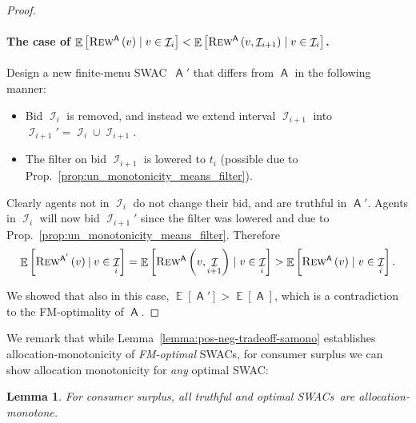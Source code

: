\documentclass[11pt,letterpaper]{article}
\newcommand{\sqbr}[1]{\left[ #1 \right]}
\newcommand{\amono}{allocation-monotone\xspace}
\newcommand{\swac}{SWAC\xspace}
\newcommand{\swacs}{SWACs\xspace}
\newcommand{\finauc}{finite-menu \swac}
\DeclareMathOperator*{\E}{\bb{E}}
\newcommand{\given}{\medspace | \medspace}
\newcommand{\bb}[1]{\mathbb{#1}}
\DeclareMathOperator{\A}{\auc{A}}
\DeclareMathOperator{\I}{\mathcal{I}}
\newcommand{\g}{g}
\theoremstyle{plain}
\newtheorem{lemma}[theorem]{Lemma}
\newcommand{\auc}[1]{\mathsf{#1}}
\begin{document}
\begin{proof}
\paragraph{The case of $\E\sqbr{\trew[\A]{v}\mid v\in\I_i}<\E\sqbr{\rew[\A]{v}{\I_{i+1}}\mid v\in\I_i}$.}
Design a new \finauc\ $\A'$ that differs from $\A$ in the following manner:
        \begin{itemize}
            \item Bid $\I_i$ is removed, and instead we extend interval $\I_{i+1}$ into $\I_{i+1}'=\I_i\cup\I_{i+1}$.
            \item The filter on bid $\I_{i+1}$ is lowered to $t_i$ (possible due to Prop.~\ref{prop:un_monotonicity_means_filter}).
        \end{itemize}
        Clearly agents not in $\I_i$ do not change their bid, and are truthful in $\A'$. Agents in $\I_i$ will now bid $\I_{i+1}'$ since the filter was lowered and due to Prop.~\ref{prop:un_monotonicity_means_filter}. Therefore 
        \begin{align*}
            \E\sqbr{\trew[\A']{v}\given v\in\I_i}=\E\sqbr{\rew[\A]{v}{\I_{i+1}}\mid v\in\I_i}>\E\sqbr{\trew[\A]{v}\mid v\in\I_i}.
        \end{align*}

    We showed that also in this case, $\E\sqbr{\A'}>\E\sqbr{\A}$, which is a contradiction to the FM-optimality of $\A$.
\end{proof}


We remark that while Lemma~\ref{lemma:pos-neg-tradeoff-samono} establishes allocation-monotonicity of \emph{FM-optimal} \swacs,  for consumer surplus
we can show allocation monotonicity for \emph{any} optimal \swac:
\begin{lemma}\label{lemma:consumer-surplus-amono}
For consumer surplus, %
    all truthful and optimal \swacs\ are \amono.
\end{lemma}
\end{document}

